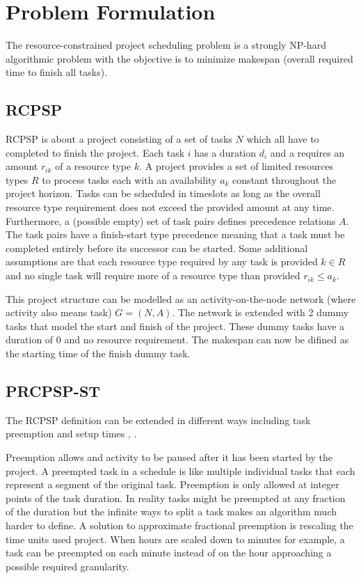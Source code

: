 \section{Problem Formulation}
The resource-constrained project scheduling problem is a strongly NP-hard algorithmic problem \cite{RN20} with the objective is to minimize makespan (overall required time to finish all tasks). 

\subsection{RCPSP}
RCPSP is about a project consisting of a set of tasks \(N\) which all have to completed to finish the project. Each task \(i\) has a duration \(d_i\) and a requires an amount \(r_{ik}\) of a resource type \(k\). A project provides a set of limited resources types \(R\) to process tasks each with an availability \(a_k\) constant throughout the project horizon. Tasks can be scheduled in timeslots as long as the overall resource type requirement does not exceed the provided amount at any time. Furthermore, a (possible empty) set of  task pairs defines precedence relations \(A\). The task pairs have a finish-start type precedence meaning that a task must be completed entirely before its successor can be started. Some additional assumptions are that each resource type required by any task is provided \(k\in R\) and no single task will require more of a resource type than provided \(r_{ik}\leq a_k\).

This project structure can be modelled as an activity-on-the-node network (where activity also means task) \(G=(N,A)\). The network is extended with 2 dummy tasks that model the start and finish of the project. These dummy tasks have a duration of 0 and no resource requirement. The makespan can now be difined as the starting time of the finish dummy task.

\subsection{PRCPSP-ST}
The RCPSP definition can be extended in different ways including task preemption and setup times \cite{RN6}, \cite{RN27}.

Preemption allows and activity to be paused after it has been started by the project. A preempted task in a schedule is like multiple individual tasks that each represent a segment of the original task. Preemption is only allowed at integer points of the task duration. In reality tasks might be preempted at any fraction of the duration but the infinite ways to split a task makes an algorithm much harder to define. A solution to approximate fractional preemption is rescaling the time units used project. When hours are scaled down to minutes for example, a task can be preempted on each minute instead of on the hour approaching a possible required granularity.

